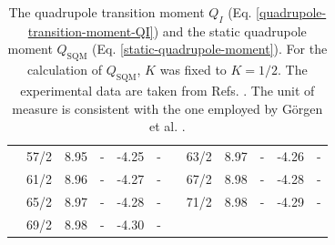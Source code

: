 \begin{table}
{\begin{tabular}{|c|c|c|c|c|c|c|ccccc|}
    & 57/2 & 8.95 & - & -4.25 & - &  & \multicolumn{1}{c|}{63/2} & \multicolumn{1}{c|}{8.97} & \multicolumn{1}{c|}{-} & \multicolumn{1}{c|}{-4.26} & - \\ \cline{2-6} \cline{8-12} 
    & 61/2 & 8.96 & - & -4.27 & - &  & \multicolumn{1}{c|}{67/2} & \multicolumn{1}{c|}{8.98} & \multicolumn{1}{c|}{-} & \multicolumn{1}{c|}{-4.28} & - \\ \cline{2-6} \cline{8-12} 
    & 65/2 & 8.97 & - & -4.28 & - &  & \multicolumn{1}{c|}{71/2} & \multicolumn{1}{c|}{8.98} & \multicolumn{1}{c|}{-} & \multicolumn{1}{c|}{-4.29} & - \\ \cline{2-6} \cline{8-12} 
    & 69/2 & 8.98 & - & -4.30 & - &  & \multicolumn{5}{c|}{} \\ \hline
    \end{tabular}%
    }
    \caption{The quadrupole transition moment $Q_I$ (Eq. \ref{quadrupole-transition-moment-QI}) and the static quadrupole moment $Q_\text{SQM}$ (Eq. \ref{static-quadrupole-moment}). For the calculation of $Q_\text{SQM}$, $K$ was fixed to $K=1/2$. The experimental data are taken from Refs. \cite{gorgen2004quadrupole,jensen2002wobbling,reich2010nuclear}. The unit of measure is consistent with the one employed by Görgen et al. \cite{gorgen2004quadrupole}.}
    \label{table-quadrupole-QI-QSQM-numerical-results}
\end{table}

